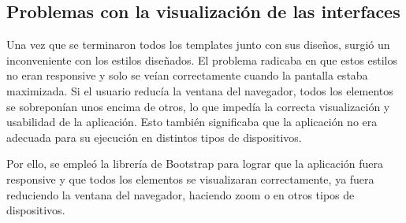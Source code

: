 \subsection{Problemas con la visualización de las interfaces}
Una vez que se terminaron todos los templates junto con sus diseños, surgió un inconveniente con los estilos diseñados. El problema radicaba en que estos estilos no eran responsive y solo se veían correctamente cuando la pantalla estaba maximizada. Si el usuario reducía la ventana del navegador, todos los elementos se sobreponían unos encima de otros, lo que impedía la correcta visualización y usabilidad de la aplicación. Esto también significaba que la aplicación no era adecuada para su ejecución en distintos tipos de dispositivos.

Por ello, se empleó la librería de Bootstrap para lograr que la aplicación fuera responsive y que todos los elementos se visualizaran correctamente, ya fuera reduciendo la ventana del navegador, haciendo zoom o en otros tipos de dispositivos.
